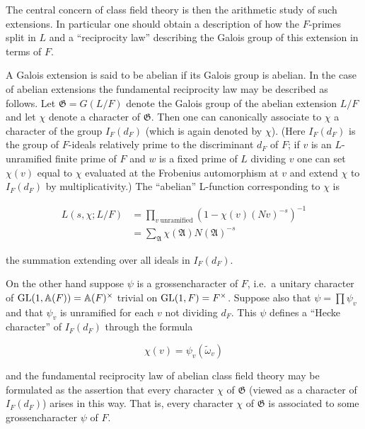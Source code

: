 The central concern of class field theory is then the arithmetic study of such extensions. In particular one should obtain a description of how the $F$-primes split in $L$ and a ``reciprocity law'' describing the Galois group of this extension in terms of $F$.

A Galois extension is said to be abelian if its Galois group is abelian. In the case of abelian extensions the fundamental reciprocity law may be described as follows. Let $\mathfrak{G} = G(L/F)$ denote the Galois group of the abelian extension $L/F$ and let $\chi$ denote a character of $\mathfrak{G}$. Then one can canonically associate to $\chi$ a character of the group $I_F(d_F)$ (which is again denoted by $\chi$). (Here $I_F(d_F)$ is the group of $F$-ideals relatively prime to the discriminant $d_F$ of $F$; if $v$ is an $L$-unramified finite prime of $F$ and $w$ is a fixed prime of $L$ dividing $v$ one can set $\chi(v)$ equal to $\chi$ evaluated at the Frobenius automorphism at $v$ and extend $\chi$ to $I_F(d_F)$ by multiplicativity.) The ``abelian'' L-function corresponding to $\chi$ is

\begin{equation}\label{eq:7.48}
\begin{aligned}
L(s,\chi; L/F) &= \prod_{v\ \mathrm{unramified}} (1 - \chi(v)(Nv)^{-s})^{-1}\\
&= \sum_{\mathfrak{A}} \chi(\mathfrak{A})N(\mathfrak{A})^{-s}
\end{aligned}\tag{7.48}
\end{equation}

the summation extending over all ideals in $I_F(d_F)$.

On the other hand suppose $\psi$ is a grossencharacter of $F$, i.e.\ a unitary character of $\operatorname{GL}(1,\mathbb{A}(F)) = \mathbb{A}(F)^{\times}$ trivial on $\operatorname{GL}(1,F) = F^{\times}$. Suppose also that $\psi = \prod \psi_v$ and that $\psi_v$ is unramified for each $v$ not dividing $d_F$. This $\psi$ defines a ``Hecke character'' of $I_F(d_F)$ through the formula

\begin{equation}\label{eq:7.49}
\chi(v) = \psi_v(\tilde{\omega}_v)\tag{7.49}
\end{equation}

and the fundamental reciprocity law of abelian class field theory may be formulated as the assertion that every character $\chi$ of $\mathfrak{G}$ (viewed as a character of $I_F(d_F)$) arises in this way. That is, every character $\chi$ of $\mathfrak{G}$ is associated to some grossencharacter $\psi$ of $F$.

